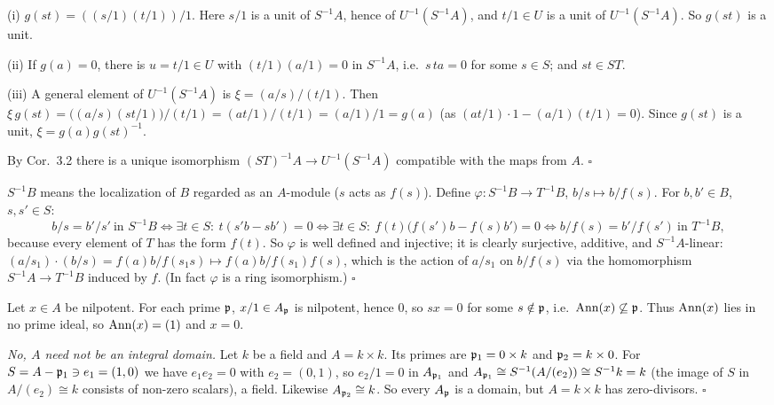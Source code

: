\documentclass[11pt]{article}
\begin{document}
(i) $g(st)=((s/1)(t/1))/1$. Here $s/1$ is a unit of $S^{-1}A$, hence of $U^{-1}(S^{-1}A)$, and $t/1\in U$ is a unit of $U^{-1}(S^{-1}A)$. So $g(st)$ is a unit.

(ii) If $g(a)=0$, there is $u=t/1\in U$ with $(t/1)(a/1)=0$ in $S^{-1}A$, i.e.\ $s\,ta=0$ for some $s\in S$; and $st\in ST$.

(iii) A general element of $U^{-1}(S^{-1}A)$ is $\xi=(a/s)/(t/1)$. Then $\xi\,g(st)=\bigl((a/s)(st/1)\bigr)/(t/1)=(at/1)/(t/1)=(a/1)/1=g(a)$ (as $(at/1)\cdot1-(a/1)(t/1)=0$). Since $g(st)$ is a unit, $\xi=g(a)g(st)^{-1}$.

By Cor.\ 3.2 there is a unique isomorphism $(ST)^{-1}A\to U^{-1}(S^{-1}A)$ compatible with the maps from $A$. \hfill$\square$

\pf
$S^{-1}B$ means the localization of $B$ regarded as an $A$-module ($s$ acts as $f(s)$). Define $\varphi:S^{-1}B\to T^{-1}B$, $b/s\mapsto b/f(s)$. For $b,b'\in B$, $s,s'\in S$:
\[
b/s=b'/s'\ \text{in }S^{-1}B\iff\exists t\in S:\ t(s'b-sb')=0\iff\exists t\in S:\ f(t)\bigl(f(s')b-f(s)b'\bigr)=0\iff b/f(s)=b'/f(s')\ \text{in }T^{-1}B,
\]
because every element of $T$ has the form $f(t)$. So $\varphi$ is well defined and injective; it is clearly surjective, additive, and $S^{-1}A$-linear: $(a/s_1)\cdot(b/s)=f(a)b/f(s_1s)\mapsto f(a)b/f(s_1)f(s)$, which is the action of $a/s_1$ on $b/f(s)$ via the homomorphism $S^{-1}A\to T^{-1}B$ induced by $f$. (In fact $\varphi$ is a ring isomorphism.) \hfill$\square$

\pf
Let $x\in A$ be nilpotent. For each prime $\mathfrak p$, $x/1\in A_\mathfrak p$ is nilpotent, hence $0$, so $sx=0$ for some $s\notin\mathfrak p$, i.e.\ $\operatorname{Ann}(x)\not\subseteq\mathfrak p$. Thus $\operatorname{Ann}(x)$ lies in no prime ideal, so $\operatorname{Ann}(x)=(1)$ and $x=0$.

\emph{No, $A$ need not be an integral domain.} Let $k$ be a field and $A=k\times k$. Its primes are $\mathfrak p_1=0\times k$ and $\mathfrak p_2=k\times0$. For $S=A-\mathfrak p_1\ni e_1=(1,0)$ we have $e_1e_2=0$ with $e_2=(0,1)$, so $e_2/1=0$ in $A_{\mathfrak p_1}$ and $A_{\mathfrak p_1}\cong S^{-1}(A/(e_2))\cong S^{-1}k=k$ (the image of $S$ in $A/(e_2)\cong k$ consists of non-zero scalars), a field. Likewise $A_{\mathfrak p_2}\cong k$. So every $A_\mathfrak p$ is a domain, but $A=k\times k$ has zero-divisors. \hfill$\square$
\end{document}
